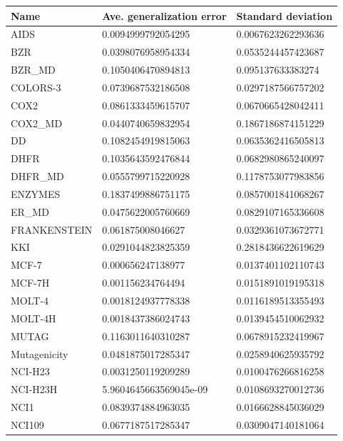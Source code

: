 \begin{table}[!ht]
    \centering
    \footnotesize
    \begin{tabular}{p{3.5cm}|p{5cm}p{5cm}}
    \hline
    \toprule
        Name & Ave. generalization error & Standard deviation \\ 
    \midrule
        AIDS & 0.0094999792054295 & 0.0067623262293636 \\
        BZR & 0.0398076958954334 & 0.0535244457423687 \\
        BZR\_MD & 0.1050406470894813 & 0.095137633383274 \\
        COLORS-3 & 0.0739687532186508 & 0.0297187566757202 \\
        COX2 & 0.0861333459615707 & 0.0670665428042411 \\
        COX2\_MD & 0.0440740659832954 & 0.1867186874151229 \\
        DD & 0.1082454919815063 & 0.0635362416505813 \\
        DHFR & 0.1035643592476844 & 0.0682980865240097 \\
        DHFR\_MD & 0.0555799715220928 & 0.1178753077983856 \\
        ENZYMES & 0.1837499886751175 & 0.0857001841068267 \\
        ER\_MD & 0.0475622005760669 & 0.0829107165336608 \\
        FRANKENSTEIN & 0.061875008046627 & 0.0329361073672771 \\
        KKI & 0.0291044823825359 & 0.2818436622619629 \\
        MCF-7 & 0.000656247138977 & 0.0137401102110743 \\
        MCF-7H & 0.001156234764494 & 0.0151891019195318 \\
        MOLT-4 & 0.0018124937778338 & 0.0116189513355493 \\
        MOLT-4H & 0.0018437386024743 & 0.0139454510062932 \\
        MUTAG & 0.1163011640310287 & 0.0678915232419967 \\
        Mutagenicity & 0.0481875017285347 & 0.0258940625935792 \\
        NCI-H23 & 0.0031250119209289 & 0.0100476266816258 \\
        NCI-H23H & 5.9604645663569045e-09 & 0.0108693270012736 \\
        NCI1 & 0.0839374884963035 & 0.0166628845036029 \\
        NCI109 & 0.0677187517285347 & 0.0309047140181064 \\

\end{tabular}
\end{table}
